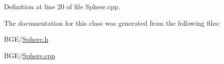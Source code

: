 Definition at line 20 of file Sphere.\-cpp.



The documentation for this class was generated from the following files\-:\begin{DoxyCompactItemize}
\item 
B\-G\-E/\hyperlink{_sphere_8h}{Sphere.\-h}\item 
B\-G\-E/\hyperlink{_sphere_8cpp}{Sphere.\-cpp}\end{DoxyCompactItemize}
